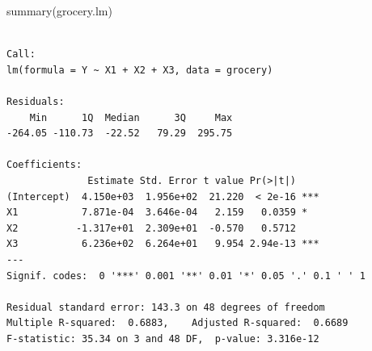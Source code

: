 \documentclass[
  letterpaper,
  DIV=11,
  numbers=noendperiod]{scrartcl}
\newenvironment{Shaded}{\begin{snugshade}}{\end{snugshade}}
\newcommand{\FunctionTok}[1]{\textcolor[rgb]{0.28,0.35,0.67}{#1}}
\newcommand{\NormalTok}[1]{\textcolor[rgb]{0.00,0.23,0.31}{#1}}
\begin{document}
\begin{Shaded}
\begin{Highlighting}[]
\FunctionTok{summary}\NormalTok{(grocery.lm)}
\end{Highlighting}
\end{Shaded}

\begin{verbatim}

Call:
lm(formula = Y ~ X1 + X2 + X3, data = grocery)

Residuals:
    Min      1Q  Median      3Q     Max 
-264.05 -110.73  -22.52   79.29  295.75 

Coefficients:
              Estimate Std. Error t value Pr(>|t|)    
(Intercept)  4.150e+03  1.956e+02  21.220  < 2e-16 ***
X1           7.871e-04  3.646e-04   2.159   0.0359 *  
X2          -1.317e+01  2.309e+01  -0.570   0.5712    
X3           6.236e+02  6.264e+01   9.954 2.94e-13 ***
---
Signif. codes:  0 '***' 0.001 '**' 0.01 '*' 0.05 '.' 0.1 ' ' 1

Residual standard error: 143.3 on 48 degrees of freedom
Multiple R-squared:  0.6883,    Adjusted R-squared:  0.6689 
F-statistic: 35.34 on 3 and 48 DF,  p-value: 3.316e-12
\end{verbatim}
\end{document}

